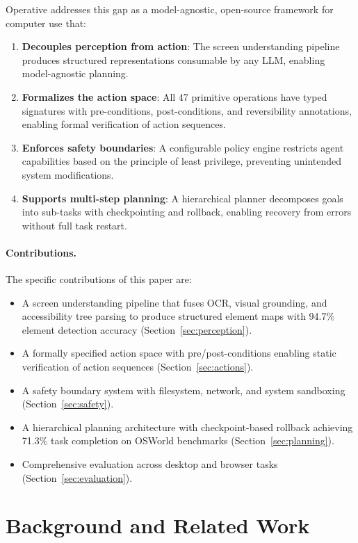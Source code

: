 \documentclass[11pt,twocolumn]{article}
\begin{document}
Operative addresses this gap as a model-agnostic, open-source framework for computer use that:

\begin{enumerate}[leftmargin=*]
    \item \textbf{Decouples perception from action}: The screen understanding pipeline produces structured representations consumable by any LLM, enabling model-agnostic planning.
    \item \textbf{Formalizes the action space}: All 47 primitive operations have typed signatures with pre-conditions, post-conditions, and reversibility annotations, enabling formal verification of action sequences.
    \item \textbf{Enforces safety boundaries}: A configurable policy engine restricts agent capabilities based on the principle of least privilege, preventing unintended system modifications.
    \item \textbf{Supports multi-step planning}: A hierarchical planner decomposes goals into sub-tasks with checkpointing and rollback, enabling recovery from errors without full task restart.
\end{enumerate}

\paragraph{Contributions.} The specific contributions of this paper are:
\begin{itemize}[leftmargin=*]
    \item A screen understanding pipeline that fuses OCR, visual grounding, and accessibility tree parsing to produce structured element maps with 94.7\% element detection accuracy (Section~\ref{sec:perception}).
    \item A formally specified action space with pre/post-conditions enabling static verification of action sequences (Section~\ref{sec:actions}).
    \item A safety boundary system with filesystem, network, and system sandboxing (Section~\ref{sec:safety}).
    \item A hierarchical planning architecture with checkpoint-based rollback achieving 71.3\% task completion on OSWorld benchmarks (Section~\ref{sec:planning}).
    \item Comprehensive evaluation across desktop and browser tasks (Section~\ref{sec:evaluation}).
\end{itemize}

\section{Background and Related Work}
\label{sec:background}
\end{document}

